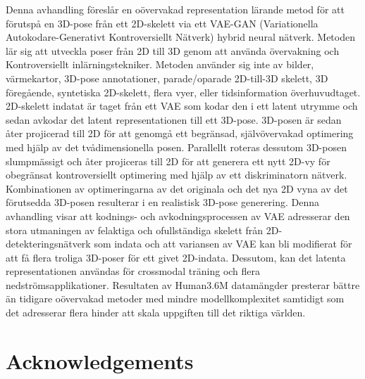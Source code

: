 Denna avhandling föreslår en oövervakad representation lärande metod för att förutspå en 3D-pose från ett 2D-skelett via ett VAE-GAN (Variationella Autokodare-Generativt Kontroversiellt Nätverk) hybrid neural nätverk. Metoden lär sig att utveckla poser från 2D till 3D genom att använda övervakning och Kontroversiellt inlärningstekniker. Metoden använder sig inte av bilder, värmekartor, 3D-pose annotationer, parade/oparade 2D-till-3D skelett, 3D föregående, syntetiska 2D-skelett, flera vyer, eller tidsinformation överhuvudtaget. 2D-skelett indatat är taget från ett VAE som kodar den i ett latent utrymme och sedan avkodar det latent representationen till ett 3D-pose. 3D-posen är sedan åter projicerad till 2D för att genomgå ett begränsad, självövervakad optimering med hjälp av det tvådimensionella posen. Parallellt roteras dessutom 3D-posen slumpmässigt och åter projiceras till 2D för att generera ett nytt 2D-vy för obegränsat kontroversiellt optimering med hjälp av ett diskriminatorn nätverk. Kombinationen av optimeringarna av det originala och det nya 2D vyna av det förutsedda 3D-posen resulterar i en realistisk 3D-pose generering. Denna avhandling visar att kodnings- och avkodningsprocessen av VAE adresserar den stora utmaningen av felaktiga och ofullständiga skelett från 2D-detekteringsnätverk som indata och att variansen av VAE kan bli modifierat för att få flera troliga 3D-poser för ett givet 2D-indata. Dessutom, kan det latenta representationen användas för crossmodal träning och flera nedströmsapplikationer. Resultaten av Human3.6M datamängder presterar bättre än tidigare oövervakad metoder med mindre modellkomplexitet samtidigt som det adresserar flera hinder att skala uppgiften till det riktiga världen.


\newpage
\thispagestyle{plain}
\chapter*{Acknowledgements}

